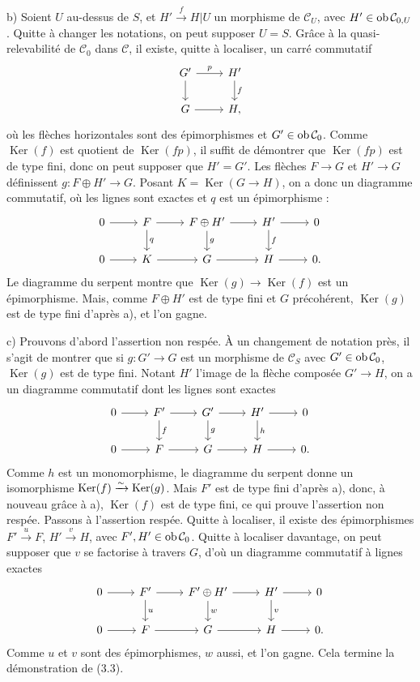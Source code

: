 \documentclass[11pt]{article}
\providecommand{\Ker}{\operatorname{Ker}}
\begin{document}
b) Soient \(U\) au-dessus de \(S\), et \(H'\xrightarrow{f}H|U\) un morphisme de \(\mathcal C_U\), avec \(H'\in\operatorname{ob}\mathcal C_{0,U}\). Quitte à changer les notations, on peut supposer \(U=S\). Grâce à la quasi-relevabilité de \(\mathcal C_0\) dans \(\mathcal C\), il existe, quitte à localiser, un carré commutatif
\[
\begin{tikzcd}
G' \arrow[r,"p"] \arrow[d] & H' \arrow[d,"f"]\\
G \arrow[r] & H,
\end{tikzcd}
\]
où les flèches horizontales sont des épimorphismes et \(G'\in\operatorname{ob}\mathcal C_0\). Comme \(\Ker(f)\) est quotient de \(\Ker(fp)\), il suffit de démontrer que \(\Ker(fp)\) est de type fini, donc on peut supposer que \(H'=G'\). Les flèches \(F\to G\) et \(H'\to G\) définissent \(g:F\oplus H'\to G\). Posant \(K=\Ker(G\to H)\), on a donc un diagramme commutatif, où les lignes sont exactes et \(q\) est un épimorphisme :
\[
\begin{tikzcd}
0\arrow[r]&F\arrow[r]\arrow[d,"q"]&F\oplus H'\arrow[r]\arrow[d,"g"]&H'\arrow[r]\arrow[d,"f"]&0\\
0\arrow[r]&K\arrow[r]&G\arrow[r]&H\arrow[r]&0 .
\end{tikzcd}
\]
Le diagramme du serpent montre que \(\Ker(g)\to\Ker(f)\) est un épimorphisme. Mais, comme \(F\oplus H'\) est de type fini et \(G\) précohérent, \(\Ker(g)\) est de type fini d'après a), et l'on gagne.

c) Prouvons d'abord l'assertion non respée. À un changement de notation près, il s'agit de montrer que si \(g:G'\to G\) est un morphisme de \(\mathcal C_S\) avec \(G'\in\operatorname{ob}\mathcal C_0\), \(\Ker(g)\) est de type fini. Notant \(H'\) l'image de la flèche composée \(G'\to H\), on a un diagramme commutatif dont les lignes sont exactes
\[
\begin{tikzcd}
0\arrow[r]&F'\arrow[r]\arrow[d,"f"]&G'\arrow[r]\arrow[d,"g"]&H'\arrow[r]\arrow[d,"h"]&0\\
0\arrow[r]&F\arrow[r]&G\arrow[r]&H\arrow[r]&0 .
\end{tikzcd}
\]
Comme \(h\) est un monomorphisme, le diagramme du serpent donne un isomorphisme \(\Ker(f)\qis\Ker(g)\). Mais \(F'\) est de type fini d'après a), donc, à nouveau grâce à a), \(\Ker(f)\) est de type fini, ce qui prouve l'assertion non respée. Passons à l'assertion respée. Quitte à localiser, il existe des épimorphismes \(F'\xrightarrow{u}F\), \(H'\xrightarrow{v}H\), avec \(F',H'\in\operatorname{ob}\mathcal C_0\). Quitte à localiser davantage, on peut supposer que \(v\) se factorise à travers \(G\), d'où un diagramme commutatif à lignes exactes
\[
\begin{tikzcd}
0\arrow[r]&F'\arrow[r]\arrow[d,"u"]&F'\oplus H'\arrow[r]\arrow[d,"w"]&H'\arrow[r]\arrow[d,"v"]&0\\
0\arrow[r]&F\arrow[r]&G\arrow[r]&H\arrow[r]&0 .
\end{tikzcd}
\]
Comme \(u\) et \(v\) sont des épimorphismes, \(w\) aussi, et l'on gagne. Cela termine la démonstration de (3.3).
\end{document}
